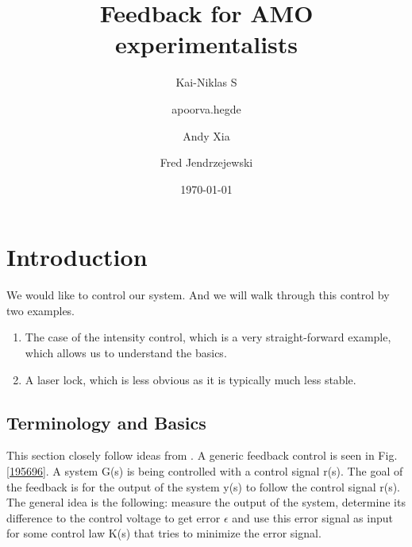 \documentclass[10pt]{article}
\let\cite\citep
\providecommand\citep{\cite}
\begin{document}
\title{Feedback for AMO experimentalists}



\author[1]{Kai-Niklas S}%
\author[1]{apoorva.hegde}%
\author[1]{Andy Xia}%
\author[1]{Fred Jendrzejewski}%
%


\vspace{-1em}



  \date{\today}


\begingroup
\let\center\flushleft
\let\endcenter\endflushleft
\maketitle
\endgroup








\sloppy


\section{Introduction}

We would like to control our system. And we will walk through this control by two examples.

\begin{enumerate}
\item The case of the intensity control, which is a very straight-forward example, which allows us to understand the basics.
\item A laser lock, which is less obvious as it is typically much less stable.
\end{enumerate}

\subsection{Terminology and Basics}
This section closely follow ideas from \cite{Bechhoefer_2005}. \newline
A generic feedback control is seen in Fig. \ref{195696}. A system G(s) is being controlled with a control signal r(s). The goal of the feedback is for the output of the system y(s) to follow the control signal r(s). The general idea is the following: measure the output of the system, determine its difference to the control voltage to get error $\epsilon$ and use this error signal as input for some control law K(s) that tries to minimize the error signal.
\end{document}
